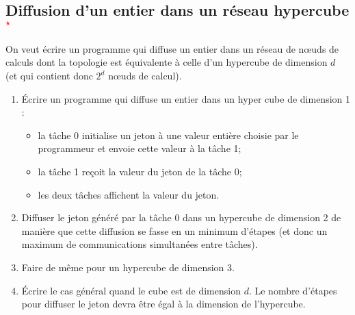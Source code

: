 \documentclass[11pt,a4paper]{article}
\begin{document}
\begin{center}
\end{center}


\subsection{Diffusion d'un entier dans un réseau hypercube\textcolor{red}{$^{\star}$}}

On veut écrire un programme qui diffuse un entier dans un réseau de n{\oe}uds de calculs dont la topologie
est équivalente à celle d'un hypercube de dimension $d$ (et qui contient donc $2^{d}$ n{\oe}uds de calcul).

\begin{enumerate}
\item \'Ecrire un programme qui diffuse un entier dans un hyper cube de dimension 1 :
\begin{itemize}
\item la tâche 0 initialise un jeton à une valeur entière choisie par le programmeur et envoie cette valeur 
à la tâche 1; 
\item la tâche 1 reçoit la valeur du jeton de la tâche 0;
\item les deux tâches affichent la valeur du jeton.
\end{itemize}
\item Diffuser le jeton généré par la tâche 0 dans un hypercube de dimension 2 de manière que cette diffusion se fasse en un minimum
d'étapes (et donc un maximum de communications simultanées entre tâches).
\item Faire de même pour un hypercube de dimension 3.
\item \'Ecrire le cas général quand le cube est de dimension $d$. Le nombre d'étapes pour diffuser le jeton devra
être égal à la dimension de l'hypercube.
\end{enumerate}
\end{document}
